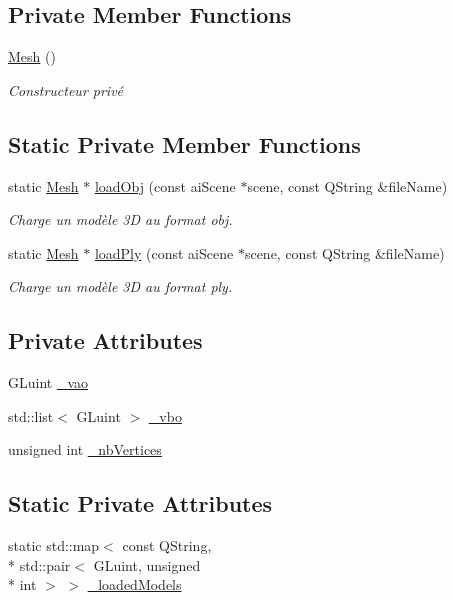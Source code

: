 \subsection*{Private Member Functions}
\begin{DoxyCompactItemize}
\item 
\hyperlink{class_mesh_a2af137f1571af89172b9c102302c416b}{Mesh} ()
\begin{DoxyCompactList}\small\item\em Constructeur privé \end{DoxyCompactList}\end{DoxyCompactItemize}
\subsection*{Static Private Member Functions}
\begin{DoxyCompactItemize}
\item 
static \hyperlink{class_mesh}{Mesh} $\ast$ \hyperlink{class_mesh_acded5b29f25b95ecbb5142e659fe4c58}{load\+Obj} (const ai\+Scene $\ast$scene, const Q\+String \&file\+Name)
\begin{DoxyCompactList}\small\item\em Charge un modèle 3\+D au format obj. \end{DoxyCompactList}\item 
static \hyperlink{class_mesh}{Mesh} $\ast$ \hyperlink{class_mesh_a157c9773238e20a98a114e0adc8f8ab5}{load\+Ply} (const ai\+Scene $\ast$scene, const Q\+String \&file\+Name)
\begin{DoxyCompactList}\small\item\em Charge un modèle 3\+D au format ply. \end{DoxyCompactList}\end{DoxyCompactItemize}
\subsection*{Private Attributes}
\begin{DoxyCompactItemize}
\item 
G\+Luint \hyperlink{class_mesh_a1949164d110452d2d7a44f5ccac34194}{\+\_\+vao}
\item 
std\+::list$<$ G\+Luint $>$ \hyperlink{class_mesh_ad14f28c038a34b836a9ff7a9d601d281}{\+\_\+vbo}
\item 
unsigned int \hyperlink{class_mesh_a6ba32034874ae52e5f69b13086ffbcf4}{\+\_\+nb\+Vertices}
\end{DoxyCompactItemize}
\subsection*{Static Private Attributes}
\begin{DoxyCompactItemize}
\item 
static std\+::map$<$ const Q\+String, \\*
std\+::pair$<$ G\+Luint, unsigned \\*
int $>$ $>$ \hyperlink{class_mesh_aa97db2c6844e7517a8f8343fb5e3259e}{\+\_\+loaded\+Models}
\end{DoxyCompactItemize}
